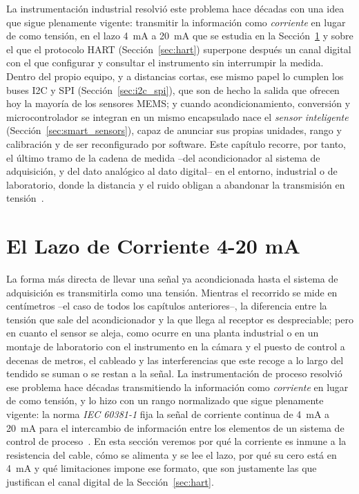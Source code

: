 La instrumentación industrial resolvió este problema hace décadas con una idea que sigue plenamente vigente: transmitir la información como \emph{corriente} en lugar de como tensión, en el lazo \SI{4}{\milli\ampere} a \SI{20}{\milli\ampere} que se estudia en la Sección~\ref{sec:lazo_420} y sobre el que el protocolo HART (Sección~\ref{sec:hart}) superpone después un canal digital con el que configurar y consultar el instrumento sin interrumpir la medida. Dentro del propio equipo, y a distancias cortas, ese mismo papel lo cumplen los buses I2C y SPI (Sección~\ref{sec:i2c_spi}), que son de hecho la salida que ofrecen hoy la mayoría de los sensores MEMS; y cuando acondicionamiento, conversión y microcontrolador se integran en un mismo encapsulado nace el \emph{sensor inteligente} (Sección~\ref{sec:smart_sensors}), capaz de anunciar sus propias unidades, rango y calibración y de ser reconfigurado por software. Este capítulo recorre, por tanto, el último tramo de la cadena de medida --del acondicionador al sistema de adquisición, y del dato analógico al dato digital-- en el entorno, industrial o de laboratorio, donde la distancia y el ruido obligan a abandonar la transmisión en tensión~\cite{pallasareny2000sensors,bentley2004measurement}.

\section{El Lazo de Corriente 4-20 mA}\label{sec:lazo_420}

La forma más directa de llevar una señal ya acondicionada hasta el sistema de adquisición es transmitirla como una tensión. Mientras el recorrido se mide en centímetros --el caso de todos los capítulos anteriores--, la diferencia entre la tensión que sale del acondicionador y la que llega al receptor es despreciable; pero en cuanto el sensor se aleja, como ocurre en una planta industrial o en un montaje de laboratorio con el instrumento en la cámara y el puesto de control a decenas de metros, el cableado y las interferencias que este recoge a lo largo del tendido se suman o se restan a la señal. La instrumentación de proceso resolvió ese problema hace décadas transmitiendo la información como \emph{corriente} en lugar de como tensión, y lo hizo con un rango normalizado que sigue plenamente vigente: la norma \emph{IEC 60381-1} fija la señal de corriente continua de \SI{4}{\milli\ampere} a \SI{20}{\milli\ampere} para el intercambio de información entre los elementos de un sistema de control de proceso~\cite{iec60381_1_1982}. En esta sección veremos por qué la corriente es inmune a la resistencia del cable, cómo se alimenta y se lee el lazo, por qué su cero está en \SI{4}{\milli\ampere} y qué limitaciones impone ese formato, que son justamente las que justifican el canal digital de la Sección~\ref{sec:hart}.

